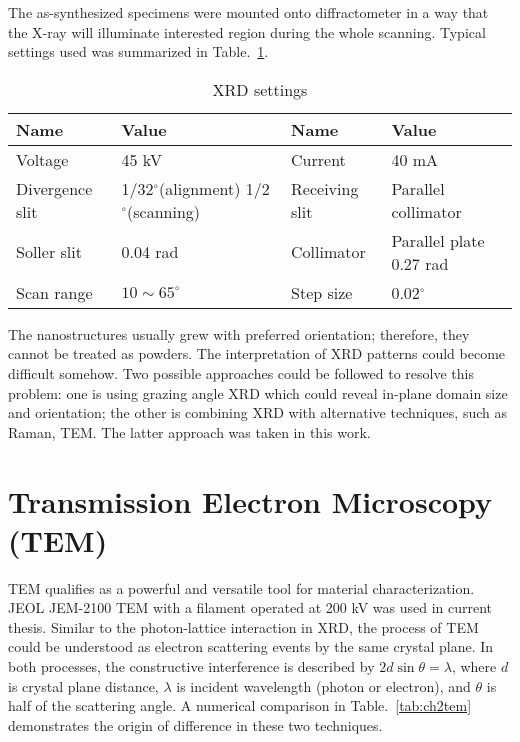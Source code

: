 The as-synthesized specimens were mounted onto diffractometer in a way that the X-ray will illuminate interested region during the whole scanning. Typical settings used was summarized in Table.~\ref{tab:ch2xrd}.

\begin{table}[htb]
\centering
\caption{XRD settings}\label{tab:ch2xrd}
\begin{tabular}{lp{1.5in}lp{1.5in}}
\toprule
Name & Value & Name & Value  \\
\midrule
Voltage   & 45 kV & Current & 40 mA \\
Divergence slit & 1/32$^\circ$(alignment) 1/2$^\circ$(scanning) & Receiving slit& Parallel collimator \\
Soller slit & 0.04 rad & Collimator & Parallel plate 0.27 rad \\
Scan range & $10 \sim 65 ^\circ$ & Step size & 0.02$^\circ$ \\
\bottomrule
\end{tabular}
\end{table}

The nanostructures usually grew with preferred orientation; therefore, they cannot be treated as powders. The interpretation of XRD patterns could become difficult somehow. Two possible approaches could be followed to resolve this problem: one is using grazing angle XRD which could reveal in-plane domain size and orientation;\cite{Tersigni2011,Goorsky2002} the other is combining XRD with alternative techniques, such as Raman, TEM. The latter approach was taken in this work. 


\section{Transmission Electron Microscopy (TEM)}



TEM qualifies as a powerful and versatile tool for material characterization. JEOL JEM-2100 TEM with a  filament operated at 200 kV was used in current thesis. Similar to the photon-lattice interaction in XRD, the process of TEM could be understood as electron scattering events by the same crystal plane. In both processes, the constructive interference is described by $2d\sin\theta = \lambda$, where $d$ is crystal plane distance, $\lambda$ is incident wavelength (photon or electron), and $\theta$ is half of the scattering angle. A numerical comparison in Table.~\ref{tab:ch2tem} demonstrates the origin of difference in these two techniques. 

